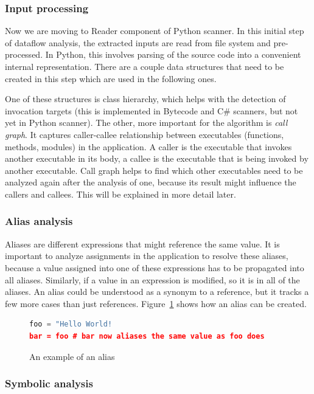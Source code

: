 \subsubsection{Input processing}

Now we are moving to Reader component of Python scanner. In this initial step of dataflow analysis, the extracted inputs are read from file system and pre-processed. In Python, this involves parsing of the source code into a convenient internal representation. There are a couple data structures that need to be created in this step which are used in the following ones.
\par
One of these structures is class hierarchy, which helps with the detection of invocation targets (this is implemented in Bytecode and C\# scanners, but not yet in Python scanner). The other, more important for the algorithm is \textit{call graph}. It captures caller-callee relationship between executables (functions, methods, modules) in the application. A caller is the executable that invokes another executable in its body, a callee is the executable that is being invoked by another executable. Call graph helps to find which other executables need to be analyzed again after the analysis of one, because its result might influence the callers and callees. This will be explained in more detail later.

\subsubsection{Alias analysis}

Aliases are different expressions that might reference the same value. It is important to analyze assignments in the application to resolve these aliases, because a value assigned into one of these expressions has to be propagated into all aliases. Similarly, if a value in an expression is modified, so it is in all of the aliases. An alias could be understood as a synonym to a reference, but it tracks a few more cases than just references. Figure~\ref{fig:alias} shows how an alias can be created.

\begin{figure}[ht]
\begin{lstlisting}[language=Python] 
foo = "Hello World!
bar = foo # bar now aliases the same value as foo does
\end{lstlisting}
\caption{An example of an alias}
\label{fig:alias}
\end{figure}

\subsubsection{Symbolic analysis}

